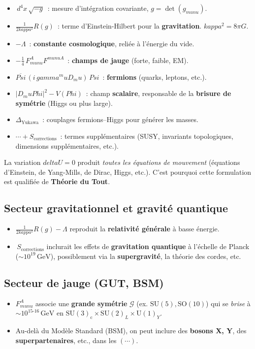 \documentclass[12pt]{article}
\def\Phi{Phi}%
\def\Psi{Psi}%
\def\kappa{kappa}%
\def\gamma{gamma}%
\def\delta{delta}%
\def\mu{mu}%
\def\nu{nu}%
\begin{document}
\begin{itemize}
    \item \(\,d^4x\,\sqrt{-g}\)~: mesure d'int\'egration covariante, $g=\det(g_{\mu\nu})$.  
    \item \(\frac{1}{2\kappa^2} R(g)\)~: terme d'Einstein-Hilbert pour la \textbf{gravitation}.  
      \(\kappa^2=8\pi G\).  
    \item \(-\Lambda\)~: \textbf{constante cosmologique}, reli\'ee \`a l'\'energie du vide.  
    \item \(-\tfrac14\,F_{\mu\nu}^A F^{\mu\nu A}\)~: \textbf{champs de jauge} (forte, faible, EM).  
    \item \(\overline{\Psi}\,(i\,\gamma^\mu D_\mu)\,\Psi\)~: \textbf{fermions} (quarks, leptons, etc.).  
    \item \(|D_\mu \Phi|^2 - V(\Phi)\)~: champ \textbf{scalaire}, responsable de la \textbf{brisure de sym\'etrie} (Higgs ou plus large).  
    \item \(\Delta_{\mathrm{Yukawa}}\)~: couplages fermions--Higgs pour g\'en\'erer les masses.  
    \item \(\cdots + S_{\text{corrections}}\)~: termes suppl\'ementaires (SUSY, invariants topologiques, dimensions suppl\'ementaires, etc.).
\end{itemize}

La variation $\delta U=0$ produit \emph{toutes les \'equations de mouvement} 
(\'equations d'Einstein, de Yang-Mills, de Dirac, Higgs, etc.). 
C'est pourquoi cette formulation est qualifi\'ee de \textbf{Th\'eorie du Tout}.

\subsection{Secteur gravitationnel et gravit\'e quantique}
\begin{itemize}
\item \(\tfrac{1}{2\kappa^2} R(g) - \Lambda\) reproduit la \textbf{relativit\'e g\'en\'erale} \cite{einstein1915} \`a basse \'energie.  
\item \(\,S_{\text{corrections}}\) inclurait les effets de \textbf{gravitation quantique} \`a l'\'echelle de Planck (\(\sim 10^{19}\,\mathrm{GeV}\)), possiblement via la \textbf{supergravité}, la th\'eorie des cordes, etc.
\end{itemize}

\subsection{Secteur de jauge (GUT, BSM)}
\begin{itemize}
    \item $F_{\mu\nu}^A$ associe une \textbf{grande sym\'etrie} $\mathcal{G}$ (ex. $\mathrm{SU}(5), \mathrm{SO}(10)$) 
          qui se \emph{brise} \`a $\sim10^{15\text{-}16}\,\mathrm{GeV}$ en $\mathrm{SU}(3)_\text{c}\times\mathrm{SU}(2)_L\times\mathrm{U}(1)_Y$.  
    \item Au-del\`a du Mod\`ele Standard (BSM), on peut inclure des \textbf{bosons X, Y}, des \textbf{superpartenaires}, etc., dans les \((\cdots)\).
\end{itemize}
\end{document}
